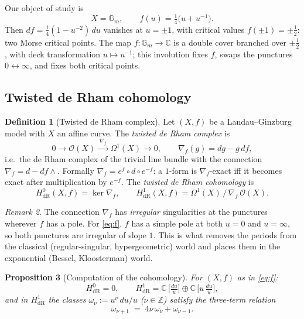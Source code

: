 \documentclass[11pt]{article}
\newtheorem{proposition}{Proposition}[section]
\theoremstyle{definition}
\newtheorem{definition}[proposition]{Definition}
\theoremstyle{remark}
\newtheorem{remark}[proposition]{Remark}
\newcommand{\C}{\mathbb{C}}
\newcommand{\Z}{\mathbb{Z}}
\newcommand{\Gm}{\mathbb{G}_m}
\newcommand{\dR}{\mathrm{dR}}
\begin{document}
Our object of study is
\begin{equation}\label{eq:f}
  X = \Gm, \qquad f(u) = \tfrac14\bigl(u + u^{-1}\bigr).
\end{equation}
Then $df = \tfrac14(1 - u^{-2})\,du$ vanishes at $u = \pm 1$, with
critical values $f(\pm1) = \pm\tfrac12$: two Morse critical points.
The map $f \colon \Gm \to \C$ is a double cover branched over
$\pm\tfrac12$, with deck transformation $u \mapsto u^{-1}$; this
involution fixes $f$, swaps the punctures $0 \leftrightarrow
\infty$, and fixes both critical points.

\subsection{Twisted de Rham cohomology}

\begin{definition}[Twisted de Rham complex]
Let $(X, f)$ be a Landau--Ginzburg model with $X$ an affine curve.
The \emph{twisted de Rham complex} is
\[
  0 \longrightarrow \mathcal O(X)
  \xrightarrow{\;\nabla_f\;} \Omega^1(X) \longrightarrow 0,
  \qquad \nabla_f(g) = dg - g\,df,
\]
i.e.\ the de Rham complex of the trivial line bundle with the
connection $\nabla_f = d - df\wedge$. Formally $\nabla_f =
e^{f} \circ d \circ e^{-f}$: a $1$-form is $\nabla_f$-exact iff it
becomes exact after multiplication by $e^{-f}$. The \emph{twisted
de Rham cohomology} is
\[
  H^0_{\dR}(X, f) = \ker \nabla_f, \qquad
  H^1_{\dR}(X, f) = \Omega^1(X)\,/\,\nabla_f\,\mathcal O(X).
\]
\end{definition}

\begin{remark}
The connection $\nabla_f$ has \emph{irregular} singularities at the
punctures wherever $f$ has a pole. For \eqref{eq:f}, $f$ has a
simple pole at both $u = 0$ and $u = \infty$, so both punctures are
irregular of slope $1$. This is what removes the periods from the
classical (regular-singular, hypergeometric) world and places them
in the exponential (Bessel, Kloosterman) world.
\end{remark}

\begin{proposition}[Computation of the cohomology]\label{prop:H1}
For $(X, f)$ as in \eqref{eq:f}:
\[
  H^0_{\dR} = 0, \qquad
  H^1_{\dR} = \C\,\bigl[\tfrac{du}{u}\bigr] \oplus
              \C\,\bigl[u\,\tfrac{du}{u}\bigr],
\]
and in $H^1_{\dR}$ the classes $\omega_\nu := u^\nu\,du/u$
($\nu \in \Z$) satisfy the three-term relation
\begin{equation}\label{eq:rec}
  \omega_{\nu+1} \;=\; 4\nu\,\omega_\nu + \omega_{\nu-1}.
\end{equation}
\end{proposition}
\end{document}
